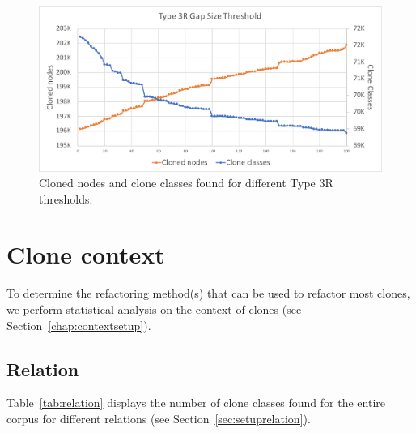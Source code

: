\begin{figure}[H]
  \includegraphics[width=1\textwidth]{img/T3R}
  \caption{Cloned nodes and clone classes found for different Type 3R thresholds.}
  \label{fig:t3rgraph}
\end{figure}

\section{Clone context}
To determine the refactoring method(s) that can be used to refactor most clones, we perform statistical analysis on the context of clones (see Section~\ref{chap:contextsetup}).

\subsection{Relation}
Table~\ref{tab:relation} displays the number of clone classes found for the entire corpus for different relations (see Section~\ref{sec:setuprelation}).


